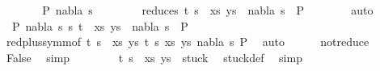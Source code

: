 \begin{isabellebody}
\ \ \ \ \isamarkupfalse%
\ \isamarkupfalse%
\ P{}\ nabla\ s{}\ \ \isanewline
\ \ \ \ \ \ reduces{\isacharcolon}{\kern0pt}\ {\isachardoublequoteopen}{\isacharparenleft}{\kern0pt}{\isacharparenleft}{\kern0pt}t{\isacharcomma}{\kern0pt}\ s{\isacharparenright}{\kern0pt}\ {\isacharhash}{\kern0pt}\ xs{\isacharcomma}{\kern0pt}\ ys{\isacharparenright}{\kern0pt}\ {\isasymTurnstile}\ {\isacharparenleft}{\kern0pt}nabla{\isacharcomma}{\kern0pt}\ s{}{\isacharparenright}{\kern0pt}\ {\isasymRightarrow}\ P{}{\isachardoublequoteclose}\isanewline
\ \ \ \ \ \ \isamarkupfalse%
\ auto\isanewline
\ \ \ \ \isamarkupfalse%
\ {\isachardoublequoteopen}{\isasymexists}\ P{}\ nabla{}\ s{}{\isachardot}{\kern0pt}\ {\isacharparenleft}{\kern0pt}{\isacharparenleft}{\kern0pt}s{\isacharcomma}{\kern0pt}\ t{\isacharparenright}{\kern0pt}\ {\isacharhash}{\kern0pt}\ xs{\isacharcomma}{\kern0pt}\ ys{\isacharparenright}{\kern0pt}\ {\isasymTurnstile}\ {\isacharparenleft}{\kern0pt}nabla{}{\isacharcomma}{\kern0pt}\ s{}{\isacharparenright}{\kern0pt}\ {\isasymRightarrow}\ P{}{\isachardoublequoteclose}\isanewline
\ \ \ \ \ \ \isamarkupfalse%
\ red{\isacharunderscore}{\kern0pt}plus{\isacharunderscore}{\kern0pt}symm{\isacharbrackleft}{\kern0pt}of\ {\isacartoucheopen}{\isacharparenleft}{\kern0pt}{\isacharparenleft}{\kern0pt}t{\isacharcomma}{\kern0pt}\ s{\isacharparenright}{\kern0pt}\ {\isacharhash}{\kern0pt}\ xs{\isacharcomma}{\kern0pt}\ ys{\isacharparenright}{\kern0pt}{\isacartoucheclose}\ t\ s\ xs\ ys\ nabla\ s{}\ P{}{\isacharbrackright}{\kern0pt}\ \isamarkupfalse%
\ auto\isanewline
\ \ \ \ \isamarkupfalse%
\ not{\isacharunderscore}{\kern0pt}reduce\ \isamarkupfalse%
\ False\ \isamarkupfalse%
\ simp\isanewline
\ \ \isamarkupfalse%
\isanewline
\ \ \isamarkupfalse%
\ \isamarkupfalse%
\ {\isachardoublequoteopen}{\isacharparenleft}{\kern0pt}{\isacharparenleft}{\kern0pt}t{\isacharcomma}{\kern0pt}\ s{\isacharparenright}{\kern0pt}\ {\isacharhash}{\kern0pt}\ xs{\isacharcomma}{\kern0pt}\ ys{\isacharparenright}{\kern0pt}\ {\isasymin}\ stuck{\isachardoublequoteclose}\ \isamarkupfalse%
\ stuck{\isacharunderscore}{\kern0pt}def\ \isamarkupfalse%
\ simp\isanewline
{}\isamarkupfalse%

\end{isabellebody}

